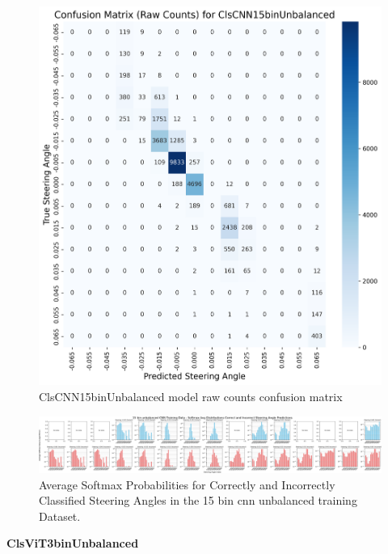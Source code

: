 \begin{figure}[H]
\centering
\includegraphics[width=1\linewidth]{Figures/Results/cm_raw_ClsCNN15binUnbalanced.png}
\caption{ClsCNN15binUnbalanced model raw counts confusion matrix}
\label{fig:cm_raw_ClsCNN15binUnbalanced}
\end{figure}

\begin{figure}[H]
    \centering
    \includegraphics[width=1\linewidth]{Figures/Results/15_bins_cnn_softmax_dist_plot_unbalanced.png}
    \caption{Average Softmax Probabilities for Correctly and Incorrectly Classified Steering Angles in the 15 bin cnn unbalanced training Dataset.}
    \label{fig:15_bins_cnn_softmax_dist_unbalanced}
\end{figure}


\textbf{ClsViT3binUnbalanced}

